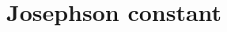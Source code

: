 \hypertarget{group___josephson_constant}{}\section{Josephson constant}
\label{group___josephson_constant}
